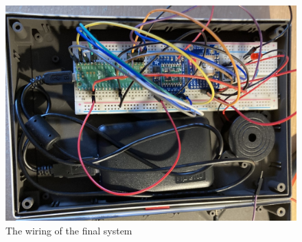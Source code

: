 \documentclass[12pt,a4paper]{report}
\begin{document}
\begin{figure}[h]
\begin{center}
\includegraphics[scale=0.15]{insideBox.jpeg}
\end{center}
\caption{The wiring of the final system}
\end{figure}
\FloatBarrier
\end{document}
